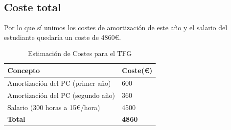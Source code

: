\subsection{Coste total}

Por lo que sí unimos los costes de amortización de este año y el salario del estudiante quedaría un coste de 4860€.
\begin{table}[h!]
\centering
\begin{tabular}{| m{15em} | m{10em} |}
 \hline
 \textbf{Concepto} & \textbf{Coste(€)} \\ 
 \hline
 Amortización del PC (primer año) &  600 \\ 
 \hline
 Amortización del PC (segundo año) &  360 \\ 
 \hline
 Salario (300 horas a 15€/hora)  & 4500 \\ 
 \hline
 \textbf{Total} & \textbf{4860} \\
 \hline
\end{tabular}
\caption{Estimación de Costes para el TFG}
\label{table:1}
\end{table}